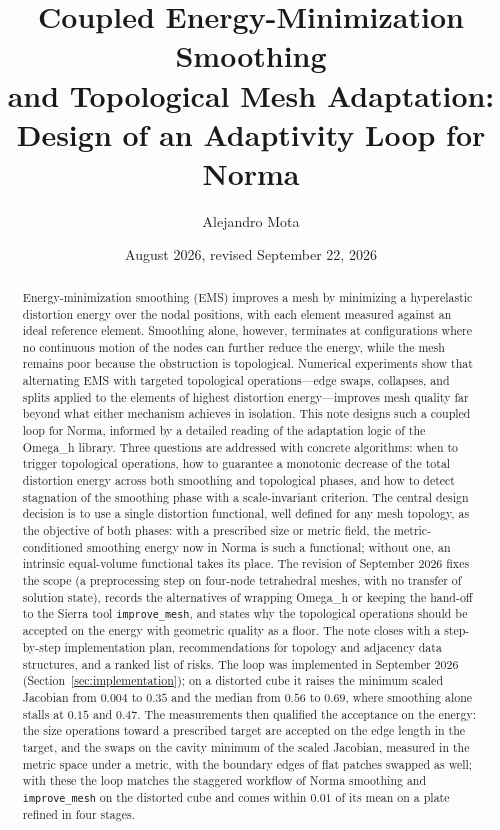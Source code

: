 \documentclass[11pt]{article}
\title{Coupled Energy-Minimization Smoothing\\
and Topological Mesh Adaptation:\\
Design of an Adaptivity Loop for Norma}
\author{Alejandro Mota}
\date{August 2026, revised September 22, 2026}
\newcommand{\code}[1]{\texttt{#1}}
\newcommand{\omegah}{Omega\_h}
\begin{document}
\maketitle

\begin{abstract}
Energy-minimization smoothing (EMS) improves a mesh by minimizing a
hyperelastic distortion energy over the nodal positions, with each element
measured against an ideal reference element. Smoothing alone, however,
terminates at configurations where no continuous motion of the nodes can
further reduce the energy, while the mesh remains poor because the
obstruction is topological. Numerical experiments show that alternating
EMS with targeted topological operations---edge swaps, collapses, and
splits applied to the elements of highest distortion energy---improves
mesh quality far beyond what either mechanism achieves in isolation. This
note designs such a coupled loop for Norma, informed by a detailed reading
of the adaptation logic of the \omegah{} library. Three questions are
addressed with concrete algorithms: when to trigger topological
operations, how to guarantee a monotonic decrease of the total distortion
energy across both smoothing and topological phases, and how to detect
stagnation of the smoothing phase with a scale-invariant criterion. The
central design decision is to use a single distortion functional, well
defined for any mesh topology, as the objective of both phases: with a
prescribed size or metric field, the metric-conditioned smoothing energy
now in Norma is such a functional; without one, an intrinsic
equal-volume functional takes its place. The revision of September 2026
fixes the scope (a preprocessing step on four-node tetrahedral meshes,
with no transfer of solution state), records the alternatives of wrapping
\omegah{} or keeping the hand-off to the Sierra tool \code{improve\_mesh},
and states why the topological operations should be accepted on the
energy with geometric quality as a floor. The note closes with a
step-by-step implementation plan, recommendations for topology and
adjacency data structures, and a ranked list of risks. The loop was
implemented in September 2026 (Section~\ref{sec:implementation}); on a
distorted cube it raises the minimum scaled Jacobian from $0.004$ to
$0.35$ and the median from $0.56$ to $0.69$, where smoothing alone stalls
at $0.15$ and $0.47$. The measurements then qualified the acceptance on
the energy: the size operations toward a prescribed target are accepted
on the edge length in the target, and the swaps on the cavity minimum of
the scaled Jacobian, measured in the metric space under a metric, with
the boundary edges of flat patches swapped as well; with these the loop
matches the staggered workflow of Norma smoothing and
\code{improve\_mesh} on the distorted cube and comes within $0.01$ of its
mean on a plate refined in four stages.
\end{abstract}
\end{document}
